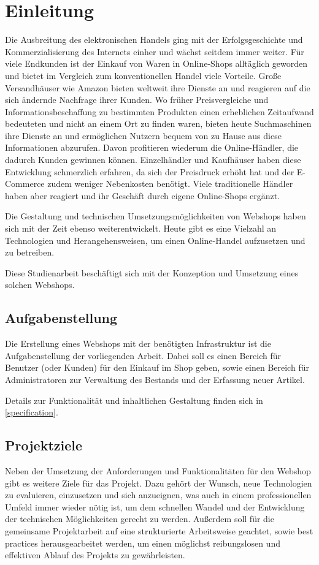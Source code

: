\section{Einleitung} \thispagestyle{nomarkstyle}
Die Ausbreitung des elektronischen Handels ging mit der Erfolgsgeschichte und Kommerzialisierung des Internets einher und wächst seitdem immer weiter.
Für viele Endkunden ist der Einkauf von Waren in Online-Shops alltäglich geworden und bietet im Vergleich zum konventionellen Handel viele Vorteile.
Große Versandhäuser wie Amazon bieten weltweit ihre Dienste an und reagieren auf die sich ändernde Nachfrage ihrer Kunden.
Wo früher Preisvergleiche und Informationsbeschaffung zu bestimmten Produkten einen erheblichen Zeitaufwand bedeuteten und nicht an einem Ort zu finden waren, bieten heute Suchmaschinen ihre Dienste an und ermöglichen Nutzern bequem von zu Hause aus diese Informationen abzurufen.
Davon profitieren wiederum die Online-Händler, die dadurch Kunden gewinnen können.
Einzelhändler und Kaufhäuser haben diese Entwicklung schmerzlich erfahren, da sich der Preisdruck erhöht hat und der E-Commerce zudem weniger Nebenkosten benötigt.
Viele traditionelle Händler haben aber reagiert und ihr Geschäft durch eigene Online-Shops ergänzt. \cite{Riehm}

Die Gestaltung und technischen Umsetzungsmöglichkeiten von Webshops haben sich mit der Zeit ebenso weiterentwickelt.
Heute gibt es eine Vielzahl an Technologien und Herangehensweisen, um einen Online-Handel aufzusetzen und zu betreiben.

Diese Studienarbeit beschäftigt sich mit der Konzeption und Umsetzung eines solchen Webshops.

\subsection{Aufgabenstellung}
Die Erstellung eines Webshops mit der benötigten Infrastruktur ist die Aufgabenstellung der vorliegenden Arbeit.
Dabei soll es einen Bereich für Benutzer (oder Kunden) für den Einkauf im Shop geben, sowie einen Bereich für Administratoren zur Verwaltung des Bestands und der Erfassung neuer Artikel.

Details zur Funktionalität und inhaltlichen Gestaltung finden sich in \cref{specification}.
\subsection{Projektziele}
Neben der Umsetzung der Anforderungen und Funktionalitäten für den Webshop gibt es weitere Ziele für das Projekt.
Dazu gehört der Wunsch, neue Technologien zu evaluieren, einzusetzen und sich anzueignen, was auch in einem professionellen Umfeld immer wieder nötig ist, um dem schnellen Wandel und der Entwicklung der technischen Möglichkeiten gerecht zu werden.
Außerdem soll für die gemeinsame Projektarbeit auf eine strukturierte Arbeitsweise geachtet, sowie best practices herausgearbeitet werden, um einen möglichst reibungslosen und effektiven Ablauf des Projekts zu gewährleisten.
